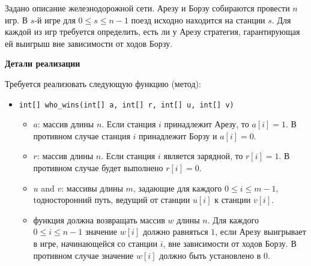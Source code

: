 Задано описание железнодорожной сети. Арезу и Борзу собираются провести $n$ игр. В $s$-й игре для $0 \le s \le n - 1$ поезд исходно находится на станции $s$. Для каждой из игр требуется определить, есть ли у Арезу стратегия, гарантирующая ей выигрыш вне зависимости от ходов Борзу.

\textbf{Детали реализации}

Требуется реализовать следующую функцию (метод):

\begin{itemize}
\item \texttt{int[] who\_wins(int[] a, int[] r, int[] u, int[] v)}
\begin{itemize}
\item $a$: массив длины $n$. Если станция $i$ принадлежит Арезу, то $a[i] = 1$. В противном случае станция $i$ принадлежит Борзу и $a[i] = 0$.
\item $r$: массив длины $n$. Если станция $i$ является зарядной, то $r[i] = 1$. В противном случае будет выполнено $r[i] = 0$.
\item $u$ and $v$:  массивы длины $m$, задающие для каждого $0 \leq i \leq m - 1$, tодносторонний путь, ведущий от станции $u[i]$ к станции $v[i]$.
\item функция должна возвращать массив $w$ длины $n$. Для каждого $0 \leq i \leq n-1$ значение $w[i]$ должно равняться $1$, если Арезу выигрывает в игре, начинающейся со
станции $i$, вне зависимости от ходов Борзу. В противном случае значение $w[i]$ должно
быть установлено в $0$.
\end{itemize}
\end{itemize}







